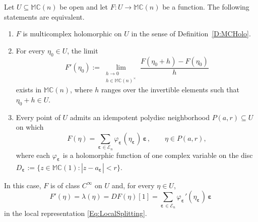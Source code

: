 \documentclass[10pt,a4paper]{amsart}
\newcommand{\bep}[1]{\bm{\varepsilon_{#1}}}
\newcommand{\mC}{\mathbb{C}}
\newcommand{\mM}{\mathbb{M}}
\newcommand{\ra}{\rightarrow}
\begin{document}
    \begin{proposition}\label{P:DerivativeEquivalence}
    Let $U \subseteq \mM \mC(n)$ be open and let $F : U \ra \mM \mC(n)$ be a
    function. The following statements are equivalent.
        \begin{enumerate}[label=(\roman*)]
        \item $F$ is multicomplex holomorphic on $U$ in the sense of
        Definition~\ref{D:MCHolo}.
        \item For every $\eta_0 \in U$, the limit
            \begin{equation}\label{Eq:MCDerivative}
            F' (\eta_0 ) := \lim_{\substack{h \ra 0 \\ h \in \mM \mC(n)^\times}}
            \frac{ F (\eta_0 + h ) - F (\eta_0 )}{h} 
            \end{equation}
        exists in $\mM \mC(n)$, where $h$ ranges over the invertible elements
        such that $\eta_0 + h \in U$.
        \item Every point of $U$ admits an idempotent polydisc neighborhood
        $P ( a , r ) \subseteq U$ on which
            \begin{equation}\label{Eq:LocalSplitting}
            F (\eta ) = \sum_{\bep{} \in \mathcal{E}_n } \varphi_{\bep{}} ( \eta_{\bep{}} )\, \bep{} ,
            \qquad \eta \in P ( a , r ),
            \end{equation}
        where each $\varphi_{\bep{}}$ is a holomorphic function of one complex
        variable on the disc
        $D_{\bep{}} := \{ z \in \mM \mC(1) : | z - a_{\bep{}} | < r \}$.
        \end{enumerate}
    In this case, $F$ is of class $C^\infty$ on $U$ and, for every
    $\eta \in U$,
        \begin{equation}\label{Eq:DerivativeIdentification}
        F' (\eta ) = \lambda (\eta ) = DF (\eta ) [ 1 ]
        = \sum_{\bep{} \in \mathcal{E}_n} \varphi_{\bep{}} ' ( \eta_{\bep{}} )\, \bep{}
        \end{equation}
    in the local representation \eqref{Eq:LocalSplitting}.
    \end{proposition}
\end{document}
